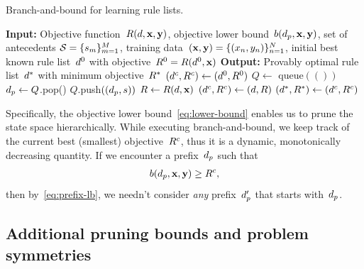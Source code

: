 \begin{algorithm}[t!]
\caption{Branch-and-bound for learning rule lists.}
\label{alg:branch-and-bound}
\begin{algorithmic}
\normalsize
\State \textbf{Input:} Objective function~$R({d}, \mathbf{x}, \mathbf{y})$,
objective lower bound~${b(d_p, \mathbf{x}, \mathbf{y})}$,
set of antecedents ${{\mathcal S} = \{s_m\}_{m=1}^M}$,
training data~$(\mathbf{x}, \mathbf{y}) = {\{(x_n, y_n)\}_{n=1}^N}$,
initial best known rule list~$d^0$ with objective~${R^0 = R(d^0, \mathbf{x})}$
\State \textbf{Output:} Provably optimal rule list~$d^*$ with minimum objective~$R^*$
\State $(d^c, R^c) \gets (d^0, R^0)$ 
\State $Q \gets $ queue$(())$ 
 
	\State $d_p \gets Q$.pop() 
	 
         
            \State $Q$.push$((d_p, s))$ 
        \EndFor
        \State $R \gets R({d}, \mathbf{x})$ 
        \If {$\Obj < \CurrentObj$}
            \State $(d^c, R^c) \gets ({d}, R)$ 
        \EndIf
    \EndIf
\EndWhile
\State $(d^*, R^*) \gets (d^c, R^c)$ 
\end{algorithmic}
\end{algorithm}

Specifically, the objective lower bound~\eqref{eq:lower-bound} enables us to prune
the state space hierarchically.
%
While executing branch-and-bound, we keep track of the current best (smallest)
objective~$R^c$, thus it is a dynamic, monotonically decreasing quantity.
%
If we encounter a prefix~$d_p$ such that
\begin{align}
b(\Prefix, \x, \y) \ge \CurrentObj,
\end{align}
then by~\eqref{eq:prefix-lb}, we needn't consider \emph{any} prefix~$d_p'$
that starts with~$d_p$.

\subsection{Additional pruning bounds and problem symmetries}

